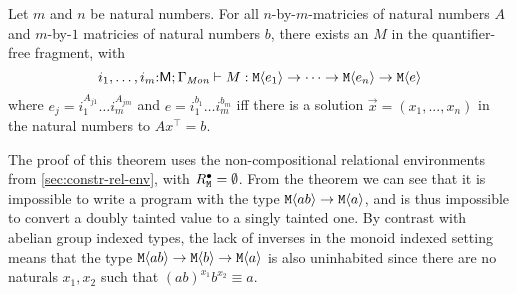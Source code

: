 







\begin{theorem}
  \label{thm:monoid-indefinability}
  Let $m$ and $n$ be natural numbers. For all $n$-by-$m$-matricies of
  natural numbers $A$ and $m$-by-$1$ matricies of natural numbers $b$,
  there exists an $M$ in the quantifier-free fragment, with
  \begin{displaymath}
    i_1,\dots,i_m\mathord:\mathsf{M}; \Gamma_{\textit{Mon}} \vdash M : \textup{\texttt{M}}\langle e_1 \rangle \to \dots \to \textup{\texttt{M}}\langle e_n \rangle \to \textup{\texttt{M}}\langle e \rangle
  \end{displaymath}
  where $e_j = i_1^{A_{j1}}\dots i_m^{A_{jm}}$ and $e = i_1^{b_1}\dots
  i_m^{b_m}$ iff there is a solution $\vec{x} = (x_1,...,x_n)$ in the
  natural numbers to $A x^\top = b$.
\end{theorem}

The proof of this theorem uses the non-compositional relational
environments from \autoref{sec:constr-rel-env}, with
$R^\bullet_{\textup{\texttt{M}}} = \emptyset$. From the theorem we can see
that it is impossible to write a program with the type
$\textup{\texttt{M}}\langle ab \rangle \to \textup{\texttt{M}}\langle a \rangle$, and is thus impossible to
convert a doubly tainted value to a singly tainted one.
%
By contrast with abelian group indexed types, the lack of inverses in
the monoid indexed setting means that the type $\textup{\texttt{M}}\langle ab \rangle \to
\textup{\texttt{M}}\langle b \rangle \to \textup{\texttt{M}}\langle a \rangle$ is also uninhabited since there are
no naturals $x_1,x_2$ such that $(ab)^{x_1}b^{x_2} \equiv a$.


